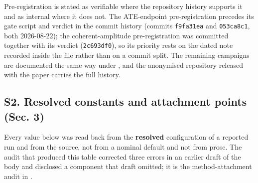 Pre-registration is stated as verifiable where the repository history supports it and as internal where it does not. The ATE-endpoint pre-registration precedes its gate script and verdict in the commit history (commits \texttt{f9fa31ea} and \texttt{053ca8c1}, both 2026-08-22); the coherent-amplitude pre-registration was committed together with its verdict (\texttt{2c693df0}), so its priority rests on the dated note recorded inside the file rather than on a commit split. The remaining campaigns are documented the same way under , and the anonymised repository released with the paper carries the full history.



\subsection{S2. Resolved constants and attachment points (Sec. 3)}


Every value below was read back from the \textbf{resolved} configuration of a reported run and from the source, not from a nominal default and not from prose. The audit that produced this table corrected three errors in an earlier draft of the body and disclosed a component that draft omitted; it is the method-attachment audit in .


